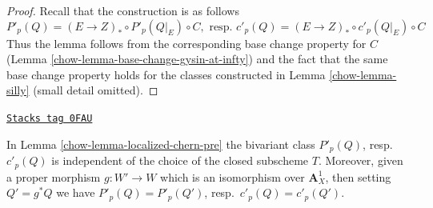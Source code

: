 \begin{proof}

Recall that the construction is as follows
$$
P'_p(Q) = (E \to Z)_* \circ P'_p(Q|_E) \circ C,\text{ resp. }
c'_p(Q) = (E \to Z)_* \circ c'_p(Q|_E) \circ C
$$
Thus the lemma follows from the corresponding base change property
for $C$ (Lemma \ref{chow-lemma-base-change-gysin-at-infty})
and the fact that the same base change property holds for the classes
constructed in Lemma \ref{chow-lemma-silly} (small detail omitted).
\end{proof}

\begin{lemma}
\label{chow-lemma-localized-chern-pre-independent}
\href{https://stacks.math.columbia.edu/tag/0FAU}{\texttt{Stacks tag 0FAU}}

In Lemma \ref{chow-lemma-localized-chern-pre} the bivariant class
$P'_p(Q)$, resp.\ $c'_p(Q)$
is independent of the choice of the closed subscheme $T$.
Moreover, given a proper morphism $g : W' \to W$ which is an
isomorphism over $\mathbf{A}^1_X$, then setting $Q' = g^*Q$
we have $P'_p(Q) = P'_p(Q')$, resp.\ $c'_p(Q) = c'_p(Q')$.
\end{lemma}

